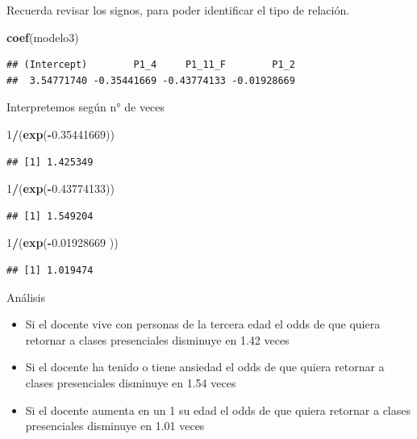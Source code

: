 \documentclass[
]{article}
\newenvironment{Shaded}{\begin{snugshade}}{\end{snugshade}}
\newcommand{\DecValTok}[1]{\textcolor[rgb]{0.00,0.00,0.81}{#1}}
\newcommand{\FloatTok}[1]{\textcolor[rgb]{0.00,0.00,0.81}{#1}}
\newcommand{\FunctionTok}[1]{\textcolor[rgb]{0.13,0.29,0.53}{\textbf{#1}}}
\newcommand{\NormalTok}[1]{#1}
\newcommand{\SpecialCharTok}[1]{\textcolor[rgb]{0.81,0.36,0.00}{\textbf{#1}}}
\begin{document}
Recuerda revisar los signos, para poder identificar el tipo de relación.

\begin{Shaded}
\begin{Highlighting}[]
\FunctionTok{coef}\NormalTok{(modelo3)}
\end{Highlighting}
\end{Shaded}

\begin{verbatim}
## (Intercept)        P1_4     P1_11_F        P1_2 
##  3.54771740 -0.35441669 -0.43774133 -0.01928669
\end{verbatim}

Interpretemos según n° de veces

\begin{Shaded}
\begin{Highlighting}[]
\DecValTok{1}\SpecialCharTok{/}\NormalTok{(}\FunctionTok{exp}\NormalTok{(}\SpecialCharTok{{-}}\FloatTok{0.35441669}\NormalTok{))}
\end{Highlighting}
\end{Shaded}

\begin{verbatim}
## [1] 1.425349
\end{verbatim}

\begin{Shaded}
\begin{Highlighting}[]
\DecValTok{1}\SpecialCharTok{/}\NormalTok{(}\FunctionTok{exp}\NormalTok{(}\SpecialCharTok{{-}}\FloatTok{0.43774133}\NormalTok{))}
\end{Highlighting}
\end{Shaded}

\begin{verbatim}
## [1] 1.549204
\end{verbatim}

\begin{Shaded}
\begin{Highlighting}[]
\DecValTok{1}\SpecialCharTok{/}\NormalTok{(}\FunctionTok{exp}\NormalTok{(}\SpecialCharTok{{-}}\FloatTok{0.01928669}\NormalTok{ ))}
\end{Highlighting}
\end{Shaded}

\begin{verbatim}
## [1] 1.019474
\end{verbatim}

Análisis

\begin{itemize}
\item
  Si el docente vive con personas de la tercera edad el odds de que
  quiera retornar a clases presenciales disminuye en 1.42 veces
\item
  Si el docente ha tenido o tiene ansiedad el odds de que quiera
  retornar a clases presenciales disminuye en 1.54 veces
\item
  Si el docente aumenta en un 1 su edad el odds de que quiera retornar a
  clases presenciales disminuye en 1.01 veces
\end{itemize}
\end{document}
